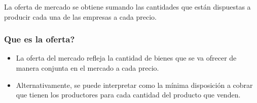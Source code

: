 \documentclass{beamer}
\begin{document}
\begin{frame}
\begin{center}
\end{center}
\centering
La oferta de mercado se obtiene sumando las cantidades que están dispuestas a producir cada una de las empresas a cada precio.
\end{frame}

\begin{frame}
    \frametitle{Qu{e es la oferta?}}
    \begin{itemize}
        \item  La oferta del mercado refleja la cantidad de bienes que se va ofrecer de manera conjunta en el mercado a cada precio.
        \item Alternativamente, se puede interpretar como la mínima disposición a cobrar que tienen los productores para cada cantidad del producto que venden.
    \end{itemize}

    \begin{center}
    \end{center}
\end{frame}
\end{document}
